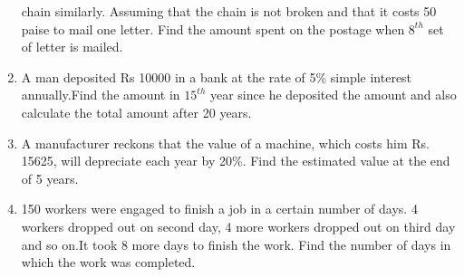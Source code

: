 \begin{enumerate}[label=\arabic*.,ref=\thesubsection.\theenumi]
chain similarly. Assuming that the chain is not broken and that it costs 50 paise to
mail one letter. Find the amount spent on the postage when $8^{th}$ set of letter is
mailed. 
\item A man deposited Rs 10000 in a bank at the rate of 5\% simple interest annually.Find the amount in $15^{th}$ year since he deposited the amount and also calculate the total amount after 20 years.
\item A manufacturer reckons that the value of a machine, which costs him Rs. 15625, will depreciate each year by 20\%. Find the estimated value at the end of 5 years. 
\item 150 workers were engaged to finish a job in a certain number of days. 4 workers dropped out on second day, 4 more workers dropped out on third day and so on.It took 8 more days to finish the work. Find the number of days in which the work was completed.
\end{enumerate}
%
    
